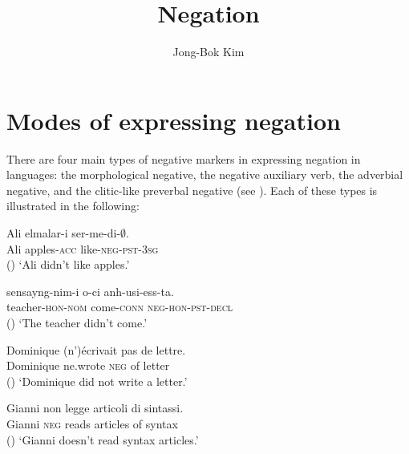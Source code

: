 \documentclass[output=paper
	        ,collection
	        ,collectionchapter
 	        ,biblatex
                ,babelshorthands
                ,newtxmath
                ,draftmode
                ,colorlinks, citecolor=brown
]{langscibook}
\author{Jong-Bok Kim\affiliation{Kyung Hee University, Seoul}}
\title{Negation}
\begin{document}
\maketitle
\label{chap-negation}

{



\section{Modes of expressing negation}


There are four main types of negative markers
in expressing negation in languages: the morphological negative,
the negative auxiliary verb, the adverbial negative, and the clitic-like
 preverbal negative (see \citealt{Dahl:79, Payne:85, Zanuttini:2001, Dryer:05}).
Each of these types is illustrated in the following:

\eal
\ex\label{negation-1a}
\gll Ali  elmalar-i  ser-me-di-$\emptyset$. \\
Ali apples-\textsc{acc}  like-\textsc{neg}-\textsc{pst}-\textsc{3sg} \\ \hfill ()
\glt `Ali didn't like apples.'

\ex\label{negation-1b}
\gll sensayng-nim-i o-ci anh-usi-ess-ta. \\
teacher-\textsc{hon}-\textsc{nom} come-\textsc{conn} \textsc{neg}-\textsc{hon}-\textsc{pst}-\textsc{decl} \\  \hfill ()
\glt `The teacher didn't come.'

\ex \label{negation-1c}
\gll Dominique (n')\'{e}crivait pas de lettre.\\
     Dominique ne.wrote \textsc{neg} of letter \\ \hfill ()
\glt `Dominique did not write a letter.'

\ex \label{negation-1d}
\gll Gianni non legge articoli di sintassi. \\
Gianni \textsc{neg} reads articles of syntax \\ \hfill ()
\glt `Gianni doesn't read syntax articles.'
\zl

}
\end{document}

